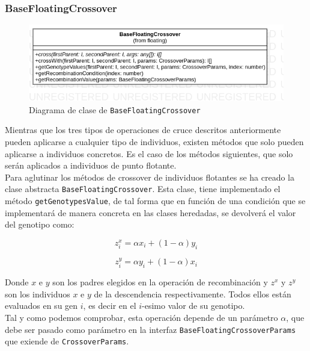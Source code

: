 \subsubsection{BaseFloatingCrossover}

\begin{figure}[ht]
    \centering
    \includegraphics[scale=0.5]{mem/images/cap-4/4.2.6(Crossover)/BaseFloating.png}
    \caption{Diagrama de clase de \texttt{BaseFloatingCrossover}}
    \label{fig:my_label}
\end{figure}

Mientras que los tres tipos de operaciones de cruce descritos anteriormente pueden aplicarse a cualquier tipo de individuos, existen métodos que solo pueden aplicarse a individuos concretos. Es el caso de los métodos siguientes, que solo serán aplicados a individuos de punto flotante. \\

Para aglutinar los métodos de crossover de individuos flotantes \cite{michalewicz2013genetic} se ha creado la clase abstracta \texttt{BaseFloatingCrossover}. Esta clase, tiene implementado el método \texttt{getGenotypesValue}, de tal forma que en función de una condición que se implementará de manera concreta en las clases heredadas, se devolverá el valor del genotipo como: 

\begin{equation}
    z^x_i = \alpha x_i + (1 - \alpha)y_i
\end{equation}

\begin{equation}
    z^y_i = \alpha y_i + (1 - \alpha)x_i
\end{equation}

Donde $x$ e $y$ son los padres elegidos en la operación de recombinación y $z^x$ y $z^y$ son los individuos $x$ e $y$ de la descendencia respectivamente. Todos ellos están evaluados en su gen $i$, es decir en el $i$-esimo valor de su genotipo. \\

Tal y como podemos comprobar, esta operación depende de un parámetro $\alpha$, que debe ser pasado como parámetro en la interfaz \texttt{BaseFloatingCrossoverParams} que exiende de \texttt{CrossoverParams}.

